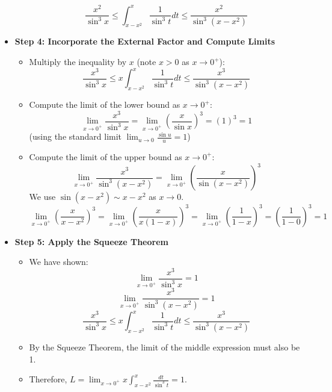 \begin{cascade}
\begin{itemize}
\begin{itemize}
			            \[ \frac{x^2}{\sin^3 x} \le \int_{x-x^2}^x \frac{1}{\sin^3 t} dt \le \frac{x^2}{\sin^3(x-x^2)} \]
		      \end{itemize}
		\item \textbf{Step 4: Incorporate the External Factor and Compute Limits}
		      \begin{itemize}
			      \item Multiply the inequality by $x$ (note $x > 0$ as $x \to 0^+$):
			            \[ \frac{x^3}{\sin^3 x} \le x \int_{x-x^2}^x \frac{1}{\sin^3 t} dt \le \frac{x^3}{\sin^3(x-x^2)} \]
			      \item Compute the limit of the lower bound as $x \to 0^+$:
			            \[ \lim_{x \to 0^+} \frac{x^3}{\sin^3 x} = \lim_{x \to 0^+} \left(\frac{x}{\sin x}\right)^3 = (1)^3 = 1 \]
			            (using the standard limit $\lim_{u \to 0} \frac{\sin u}{u} = 1$)
			      \item Compute the limit of the upper bound as $x \to 0^+$:
			            \[ \lim_{x \to 0^+} \frac{x^3}{\sin^3(x-x^2)} = \lim_{x \to 0^+} \left(\frac{x}{\sin(x-x^2)}\right)^3 \]
			            We use $\sin(x-x^2) \sim x-x^2$ as $x \to 0$.
			            \[ \lim_{x \to 0^+} \left(\frac{x}{x-x^2}\right)^3 = \lim_{x \to 0^+} \left(\frac{x}{x(1-x)}\right)^3 = \lim_{x \to 0^+} \left(\frac{1}{1-x}\right)^3 = \left(\frac{1}{1-0}\right)^3 = 1 \]
		      \end{itemize}
		\item \textbf{Step 5: Apply the Squeeze Theorem}
		      \begin{itemize}
			      \item We have shown:
			            \[ \lim_{x \to 0^+} \frac{x^3}{\sin^3 x} = 1 \]
			            \[ \lim_{x \to 0^+} \frac{x^3}{\sin^3(x-x^2)} = 1 \]
			            \[ \frac{x^3}{\sin^3 x} \le x \int_{x-x^2}^x \frac{1}{\sin^3 t} dt \le \frac{x^3}{\sin^3(x-x^2)} \]
			      \item By the Squeeze Theorem, the limit of the middle expression must also be 1.
			      \item Therefore, $L = \lim_{x \to 0^+} x \int_{x-x^2}^x \frac{dt}{\sin^3 t} = 1$.
		      \end{itemize}
	\end{itemize}
\end{cascade}

\hfill

